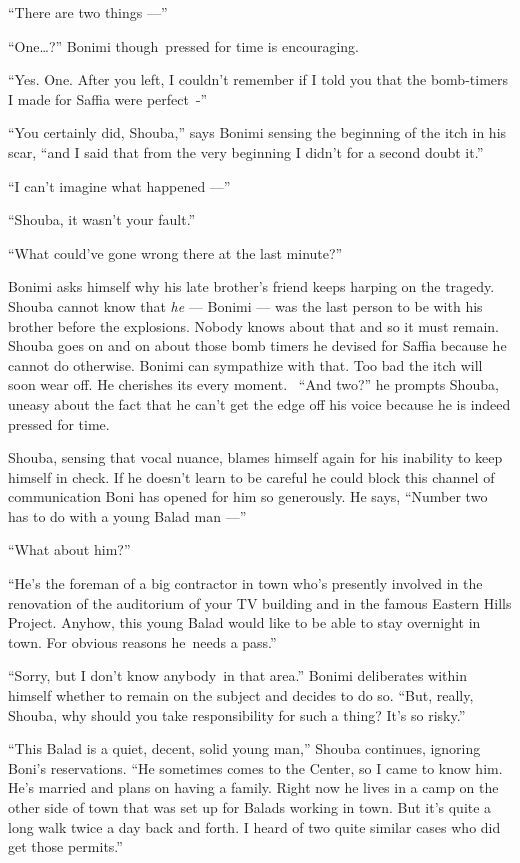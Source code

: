 \documentclass[twoside,11pt,openany]{book}
\begin{document}
``There are two things ---''

``One{\ldots}?'' Bonimi though~pressed for time is encouraging.

``Yes. One. After you left, I couldn't remember if I told you that the bomb-timers I made for Saffia were
perfect~-''

``You certainly did, Shouba,'' says Bonimi sensing the beginning of the itch in his scar,
``and I said that from the very beginning I didn't for a second doubt it.''

``I can't imagine what happened ---''

``Shouba, it wasn't your fault.''

``What could've gone wrong there at the last minute?''

Bonimi asks himself why his late brother's friend keeps harping on the tragedy. Shouba cannot know that \textit{he} ---
Bonimi --- was the last person to be with his brother before the explosions. Nobody knows about that and so it must
remain. Shouba goes on and on about those bomb timers he devised for Saffia because he cannot do otherwise. Bonimi
can sympathize with that. Too bad the itch will soon wear off. He cherishes its every moment. ~``And
two?'' he prompts Shouba, uneasy about the fact that he can't get the edge off  his voice because he is
indeed pressed for time.

Shouba, sensing that vocal nuance, blames himself again for his inability to keep himself in check. If he doesn't learn
to be careful he could block this channel of communication Boni has opened for him so generously. He says,
``Number two has to do with a young Balad man ---''

``What about him?''

``He's the foreman of a big contractor in town who's presently involved in the renovation of the auditorium
of your TV building and in the famous Eastern Hills Project. Anyhow, this young Balad would like to be able to stay
overnight in town. For obvious reasons he~needs a pass.''

``Sorry, but I don't know anybody~in that area.'' Bonimi deliberates within himself whether to
remain on the subject and decides to do so. ``But, really, Shouba, why should you take responsibility for
such a thing? It's so risky.''

``This Balad is a quiet, decent, solid young man,'' Shouba continues, ignoring Boni's
reservations. ``He sometimes comes to the Center, so I came to know him. He's married and plans on having a
family. Right now he lives in a camp on the other side of town that was set up for Balads working in town. But it's
quite a long walk twice a day back and forth. I heard of two quite similar cases who did get those
permits.''
\end{document}
